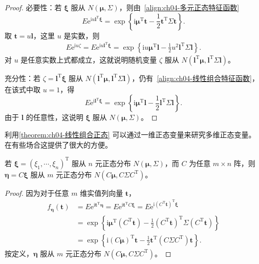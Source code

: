 \documentclass[../../main.tex]{subfiles}
\begin{document}
\begin{proof}
必要性：若 $\boldsymbol{\xi}$ 服从 $N(\boldsymbol{\mu},\Sigma)$，则由~\eqref{align:ch04-多元正态特征函数}
\[
E\mathrm{e}^{\mathrm{i}u\boldsymbol{l}^{\mathrm{T}}\boldsymbol{\xi}}=\exp\left\{\mathrm{i}\boldsymbol{\mu}^{\mathrm{T}}\boldsymbol{t}-\frac12\boldsymbol{t}^{\mathrm{T}}\Sigma\boldsymbol{t}\right\}.
\]
取 $\boldsymbol{t}=u\boldsymbol{l}$，这里 $u$ 是实数，则
\begin{align}
E\mathrm{e}^{\mathrm{i}u\zeta}=E\mathrm{e}^{\mathrm{i}u\boldsymbol{l}^{\mathrm{T}}\boldsymbol{\xi}}=\exp\left\{\mathrm{i}u\boldsymbol{\mu}^{\mathrm{T}}\boldsymbol{l}-\frac12 u^2\boldsymbol{l}^{\mathrm{T}}\Sigma\boldsymbol{l}\right\}.\label{align:ch04-线性组合特征函数}
\end{align}
对 $u$ 是任意实数上式都成立，这就说明随机变量 $\zeta$ 服从 $N(\boldsymbol{l}^{\mathrm{T}}\boldsymbol{\mu},\boldsymbol{l}^{\mathrm{T}}\Sigma\boldsymbol{l})$。

充分性：若 $\zeta=\boldsymbol{l}^{\mathrm{T}}\boldsymbol{\xi}$ 服从 $N(\boldsymbol{l}^{\mathrm{T}}\boldsymbol{\mu},\boldsymbol{l}^{\mathrm{T}}\Sigma\boldsymbol{l})$，仍有~\eqref{align:ch04-线性组合特征函数}，在该式中取 $u=1$，得
\[
E\mathrm{e}^{\mathrm{i}\boldsymbol{l}^{\mathrm{T}}\boldsymbol{\xi}}=\exp\left\{\mathrm{i}\boldsymbol{\mu}^{\mathrm{T}}\boldsymbol{l}-\frac12\boldsymbol{l}^{\mathrm{T}}\Sigma\boldsymbol{l}\right\}.
\]
由于 $\boldsymbol{l}$ 的任意性，这说明 $\boldsymbol{\xi}$ 服从 $N(\boldsymbol{\mu},\Sigma)$。
\end{proof}

利用\cref{theorem:ch04-线性组合正态} 可以通过一维正态变量来研究多维正态变量。在有些场合这提供了很大的方便。

\begin{theorem}[线性变换不变性]\label{theorem:ch04-线性变换不变性}
若 $\boldsymbol{\xi}=(\xi_1,\cdots,\xi_n)^{\mathrm{T}}$ 服从 $n$ 元正态分布 $N(\boldsymbol{\mu},\Sigma)$，而 $C$ 为任意 $m\times n$ 阵，则 $\boldsymbol{\eta}=C\boldsymbol{\xi}$ 服从 $m$ 元正态分布 $N(C\boldsymbol{\mu},C\Sigma C^{\mathrm{T}})$。
\end{theorem}

\begin{proof}
因为对于任意 $m$ 维实值列向量 $\boldsymbol{t}$，
\begin{align*}
f_{\boldsymbol{\eta}}(\boldsymbol{t})&=E\mathrm{e}^{\mathrm{i}\boldsymbol{t}^{\mathrm{T}}\boldsymbol{\eta}}=E\mathrm{e}^{\mathrm{i}\boldsymbol{t}^{\mathrm{T}}C\boldsymbol{\xi}}=E\mathrm{e}^{\mathrm{i}(C^{\mathrm{T}}\boldsymbol{t})^{\mathrm{T}}\boldsymbol{\xi}}\\
&=\exp\left\{\mathrm{i}\boldsymbol{\mu}^{\mathrm{T}}(C^{\mathrm{T}}\boldsymbol{t})-\frac12(C^{\mathrm{T}}\boldsymbol{t})^{\mathrm{T}}\Sigma(C^{\mathrm{T}}\boldsymbol{t})\right\}\\
&=\exp\left\{\mathrm{i}(C\boldsymbol{\mu})^{\mathrm{T}}\boldsymbol{t}-\frac12\boldsymbol{t}^{\mathrm{T}}(C\Sigma C^{\mathrm{T}})\boldsymbol{t}\right\}.
\end{align*}
按定义，$\boldsymbol{\eta}$ 服从 $m$ 元正态分布 $N(C\boldsymbol{\mu},C\Sigma C^{\mathrm{T}})$。
\end{proof}
\end{document}
